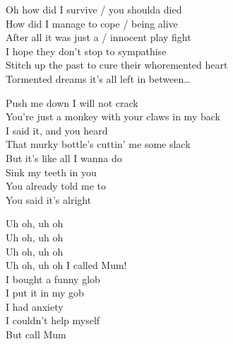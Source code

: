 Oh how did I survive / you shoulda died \\
How did I manage to cope / being alive \\
After all it was just a / innocent play fight \\
I hope they don't stop to sympathise \\

Stitch up the past to cure their whoremented heart \\

Tormented dreams it's all left in between… \\




Push me down I will not crack \\
You're just a monkey with your claws in my back \\
I said it, and you heard \\
That murky bottle's cuttin' me some slack \\

But it's like all I wanna do \\
Sink my teeth in you \\
You already told me to \\
You said it's alright \\




Uh oh, uh oh \\
Uh oh, uh oh \\
Uh oh, uh oh \\
Uh oh, uh oh I called Mum! \\

I bought a funny glob \\
I put it in my gob \\
I had anxiety \\
I couldn't help myself \\
But call Mum \\



